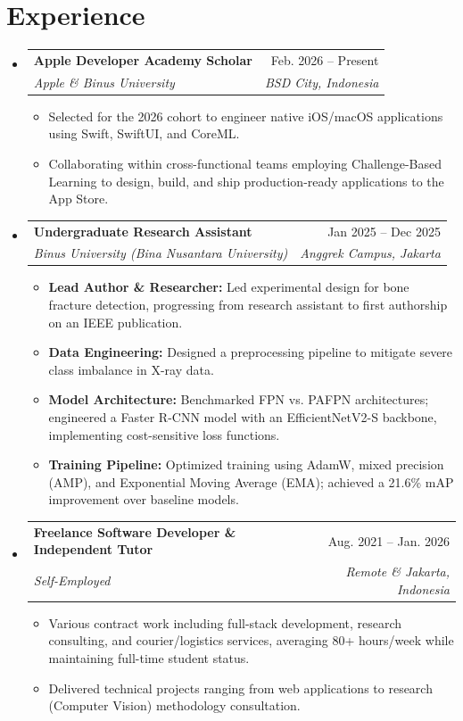 \documentclass[letterpaper,11pt]{article}
\makeatletter
\newcommand{\resumeItem}[1]{
  \item\small{
    {#1 \vspace{-2pt}}
  }
}
\newcommand{\resumeSubheading}[4]{
  \vspace{-2pt}\item
    \begin{tabular*}{0.97\textwidth}[t]{l@{\extracolsep{\fill}}r}
      \textbf{#1} & #2 \\
      \textit{\small#3} & \textit{\small #4} \\
    \end{tabular*}\vspace{-7pt}
}
\newcommand{\resumeSubHeadingListStart}{\begin{itemize}[leftmargin=0.15in, label={}]}
\newcommand{\resumeSubHeadingListEnd}{\end{itemize}}
\newcommand{\resumeItemListStart}{\begin{itemize}}
\newcommand{\resumeItemListEnd}{\end{itemize}\vspace{-5pt}}
\makeatother
\begin{document}
\section{\textbf{Experience}}
  \resumeSubHeadingListStart
    \resumeSubheading
      {Apple Developer Academy Scholar}{Feb. 2026 -- Present}
      {Apple \& Binus University}{BSD City, Indonesia}
      \resumeItemListStart
        \resumeItem{Selected for the 2026 cohort to engineer native iOS/macOS applications using Swift, SwiftUI, and CoreML.}
        \resumeItem{Collaborating within cross-functional teams employing Challenge-Based Learning to design, build, and ship production-ready applications to the App Store.}
      \resumeItemListEnd
    \resumeSubheading
      {Undergraduate Research Assistant}{Jan 2025 -- Dec 2025}
      {Binus University (Bina Nusantara University)}{Anggrek Campus, Jakarta}
      \resumeItemListStart
            \resumeItem{\textbf{Lead Author \& Researcher:} Led experimental design for bone fracture detection, progressing from research assistant to first authorship on an IEEE publication.}
            \resumeItem{\textbf{Data Engineering:} Designed a preprocessing pipeline to mitigate severe class imbalance in X-ray data.}
            \resumeItem{\textbf{Model Architecture:} Benchmarked FPN vs. PAFPN architectures; engineered a Faster R-CNN model with an EfficientNetV2-S backbone, implementing cost-sensitive loss functions.}
            \resumeItem{\textbf{Training Pipeline:} Optimized training using AdamW, mixed precision (AMP), and Exponential Moving Average (EMA); achieved a 21.6\% mAP improvement over baseline models.}
      \resumeItemListEnd

\resumeSubheading
  {Freelance Software Developer \& Independent Tutor}{Aug. 2021 -- Jan. 2026}
  {Self-Employed}{Remote \& Jakarta, Indonesia}
  \resumeItemListStart
    \resumeItem{Various contract work including full-stack development, research consulting, and courier/logistics services, averaging 80+ hours/week while maintaining full-time student status.}
    \resumeItem{Delivered technical projects ranging from web applications to research (Computer Vision) methodology consultation.}
  \resumeItemListEnd
  \resumeSubHeadingListEnd
\vspace{-4ex}
\end{document}
